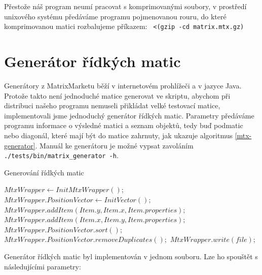\documentclass[thesis=B,czech]{FITthesis}[2012/06/26]
\begin{document}
Přestože náš program neumí pracovat s komprimovanými soubory, v prostředí unixového systému předáváme programu pojmenovanou rouru, do které komprimovanou matici rozbalujeme příkazem: \texttt{ <(gzip -cd matrix.mtx.gz) }

\section{Generátor řídkých matic}

Generátory z MatrixMarketu běží v internetovém prohlížeči a v jazyce Java. Protože takto není jednoduché matice generovat ve skriptu, abychom při distribuci našeho programu nemuseli přikládat velké testovací matice, implementovali jsme jednoduchý generátor řídkých matic. Parametry předáváme programu informace o výsledné matici a seznam objektů, tedy buď podmatic nebo diagonál, které mají být do matice zahrnuty, jak ukazuje algoritmus \ref{mtx-generator}. Manuál ke generátoru je možné vypsat zavoláním \texttt{./tests/bin/matrix\_generator -h}.    

\begin{algorithm}[H]
	\caption{Generování řídkých matic}\label{mtx-generator}
	\begin{algorithmic}[1]
		\State \texttt{$MtxWrapper \gets InitMtxWrapper();$}
		\State \texttt{$MtxWrapper.PositionVector \gets InitVector();$}	
			\State \texttt{$MtxWrapper.addItem(Item.y, Item.x, Item.properties);$}
				\State \texttt{$MtxWrapper.addItem(Item.x, Item.y, Item.properties);$}
			\EndIf
		\EndFor
		\State \texttt{$MtxWrapper.PositionVector.sort();$}
		\State \texttt{$MtxWrapper.PositionVector.removeDuplicates();$}
		\State \texttt{$MtxWrapper.write(file);$}
		\EndProcedure
	\end{algorithmic}
\end{algorithm}

Generátor řídkých matic byl implementován v jednom souboru. Lze ho spouštět s následujícími parametry:
\end{document}
